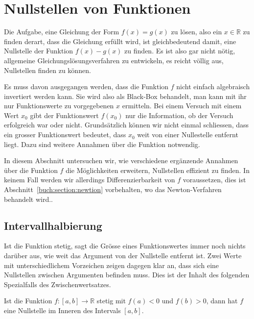 %
%
%
\section{Nullstellen von Funktionen
\label{buch:section:nullstellen}}
Die Aufgabe, eine Gleichung der Form $f(x) = g(x)$
zu lösen, also ein $x\in\mathbb R$ zu finden derart, dass die Gleichung
erfüllt wird, ist gleichbedeutend damit, eine Nullstelle der Funktion
$f(x)-g(x)$ zu finden.
Es ist also gar nicht nötig, allgemeine Gleichungslösungsverfahren zu
entwickeln, es reicht völlig aus, Nullstellen finden zu können.

Es muss davon ausgegangen werden, dass die Funktion $f$ nicht einfach
algebraisch invertiert werden kann.
Sie wird also als Black-Box behandelt, man kann mit ihr nur Funktionswerte
zu vorgegebenen $x$ ermitteln.
Bei einem Versuch mit einem Wert $x_0$ gibt der Funktionswert $f(x_0)$
nur die Information, ob der Versuch erfolgreich war oder nicht.
Grundsätzlich können wir nicht einmal schliessen, dass ein
grosser Funktionswert bedeutet, dass $x_0$ weit von einer
Nullestelle entfernt liegt.
Dazu sind weitere Annahmen über die Funktion notwendig.

In diesem Abschnitt untersuchen wir, wie verschiedene ergänzende Annahmen
über die Funktion $f$ die Möglichkeiten erweitern, Nullstellen
effizient zu finden.
In keinem Fall werden wir allerdings Differenzierbarkeit von $f$ voraussetzen,
dies ist Abschnitt~\ref{buch:section:newtion} vorbehalten, wo das
Newton-Verfahren behandelt wird..

%
%
\subsection{Intervallhalbierung
\label{buch:subsection:intervallhalbierung}}
Ist die Funktion stetig, sagt die Grösse eines Funktionswertes immer
noch nichts darüber aus, wie weit das Argument von der Nullstelle
entfernt ist.
Zwei Werte mit unterschiedlichem Vorzeichen zeigen dagegen klar an,
dass sich eine Nullstellen zwischen Argumenten befinden muss.
Dies ist der Inhalt des folgenden Spezialfalls des Zwischenwertsatzes.

\begin{satz}
\label{buch:satz:nullstellenzwsatz}
Ist die Funktion $f\colon[a,b]\to\mathbb R$ stetig mit $f(a) <0$ und $f(b)>0$,
dann hat $f$ eine Nullstelle im Inneren des Intervals $[a,b]$.
\end{satz}

